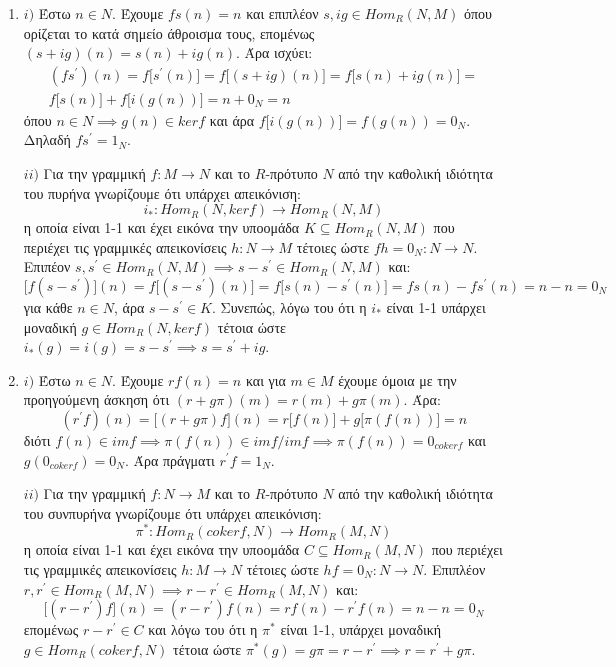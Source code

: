 \documentclass{article}
\begin{document}
\begin{enumerate}
	\item $i)$ Έστω $n \in N$. Έχουμε $fs(n) = n$ και επιπλέον $s, ig\in Hom_R (N,M)$ όπου ορίζεται το κατά σημείο άθροισμα τους, επομένως $(s+ig)(n) = s(n) + ig(n)$. Άρα ισχύει:
		\begin{gather*}(fs^{\prime})(n) = f\big[s^{\prime}(n)\big] = f \big[ (s+ig)(n) \big] = f \big[ s(n) + ig(n) \big] = \\
			f\big[ s(n)\big] + f\big[ i(g(n)) \big] = n + 0_N = n
		\end{gather*}
		όπου $n \in N \implies g(n) \in kerf$ και άρα $f\big[i(g(n))\big] = f(g(n)) = 0_N$. Δηλαδή $fs^{\prime} = 1_N$.
		$ $\newline

		$ii)$ Για την γραμμική $f: M\rightarrow N$ και το $R$-πρότυπο $N$ από την καθολική ιδιότητα του πυρήνα γνωρίζουμε ότι υπάρχει απεικόνιση:
		$$i_* : Hom_R (N,kerf) \rightarrow Hom_R (N,M)$$
		η οποία είναι 1-1 και έχει εικόνα την υποομάδα $K \subseteq Hom_R (N,M)$ που περιέχει τις γραμμικές απεικονίσεις $h: N \rightarrow M$ τέτοιες ώστε $fh = 0_N : N\rightarrow N$.
		Επιπέον $s, s^{\prime} \in Hom_R (N,M) \implies s-s^{\prime} \in Hom_R (N,M)$ και:
		$$\big[ f(s-s^{\prime})\big](n) = f\big[(s-s^{\prime})(n)\big] = f\big[ s(n) - s^{\prime}(n)\big] = fs(n) - fs^{\prime}(n) = n - n = 0_N$$
		για κάθε $n \in N$, άρα $s-s^{\prime} \in K$. Συνεπώς, λόγω του ότι η $i_*$ είναι 1-1 υπάρχει μοναδική $g \in Hom_R (N, kerf)$ τέτοια ώστε $i_* (g) = i(g) = s - s^{\prime} \implies s = s^{\prime} + ig$.
		$ $\newline
	
	
	\item $i)$ Έστω $n \in N$. Έχουμε $rf(n) = n$ και για $m \in M$ έχουμε όμοια με την προηγούμενη άσκηση ότι $(r+g\pi )(m) = r(m) + g\pi (m)$. Άρα:
		$$(r^{\prime} f)(n) = \big[ (r+g\pi ) f\big](n)  = r\big[f(n)\big] + g\big[ \pi(f(n)) \big] = n$$
		διότι $f(n) \in imf \implies \pi (f(n)) \in imf / imf \implies \pi (f(n)) = 0_{cokerf}$ και $g( 0_{cokerf} ) = 0_N$. Άρα πράγματι $r^{\prime} f = 1_N$.
		$ $\newline

		$ii)$ Για την γραμμική $f: N \rightarrow M$ και το $R$-πρότυπο $N$ από την καθολική ιδιότητα του συνπυρήνα γνωρίζουμε ότι υπάρχει απεικόνιση:
		$$\pi^* : Hom_R (cokerf, N) \rightarrow Hom_R (M,N)$$
		η οποία είναι 1-1 και έχει εικόνα την υποομάδα $C \subseteq Hom_R (M,N)$ που περιέχει τις γραμμικές απεικονίσεις $h: M \rightarrow N$ τέτοιες ώστε $hf = 0_N : N \rightarrow N$.
		Επιπλέον $r, r^{\prime} \in Hom_R (M,N) \implies r-r^{\prime} \in Hom_R(M,N)$ και:
		$$\big[ (r - r^{\prime})f\big] (n) = (r-r^{\prime})f(n) = rf(n) - r^{\prime}f(n) = n - n = 0_N$$
		επομένως $r-r^{\prime} \in C$ και λόγω του ότι η $\pi^*$ είναι 1-1, υπάρχει μοναδική $g \in Hom_R (cokerf,N)$ τέτοια ώστε $\pi^* (g) = g\pi = r - r^{\prime} \implies r = r^{\prime} + g\pi$.


	
\end{enumerate}
\end{document}
